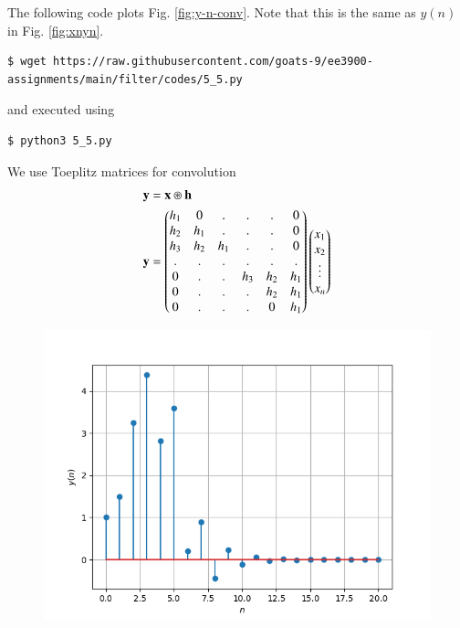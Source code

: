 \documentclass[journal,12pt,twocolumn]{IEEEtran}
\renewcommand\thesection{\arabic{section}}
\begin{document}
\begin{enumerate}[label=\thesection.\arabic*]
\solution The following code plots Fig. \eqref{fig:y-n-conv}. Note that this is
the same as $y(n)$ in  Fig. \eqref{fig:xnyn}.
\begin{lstlisting}
$ wget https://raw.githubusercontent.com/goats-9/ee3900-assignments/main/filter/codes/5_5.py
\end{lstlisting}
and executed using
\begin{lstlisting}
$ python3 5_5.py
\end{lstlisting}
We use Toeplitz matrices for convolution
\begin{align}
	\mathbf{y} &= \mathbf{x} \circledast \mathbf{h}\\
	\mathbf{y} &= 
	\begin{pmatrix}
		h_1 & 0 & . & . & . & 0 \\
		h_2 & h_1 & . & . & . & 0 \\
		h_3 & h_2 & h_1 & . & . & 0 \\
		. & . & . & . & . & . \\
		0 & . & . & h_3 & h_2 & h_1 \\
		0 & . & . & . & h_2 & h_1 \\
		0 & . & . & . & 0 & h_1
	\end{pmatrix}
	\begin{pmatrix}
		x_1 \\ x_2 \\ \vdots \\ x_n
	\end{pmatrix}
\end{align}
\begin{figure}[!ht]
	\centering
	\includegraphics[width=\columnwidth]{Figures/Q5/5__5.png}

\end{figure}
\end{enumerate}
\end{document}

